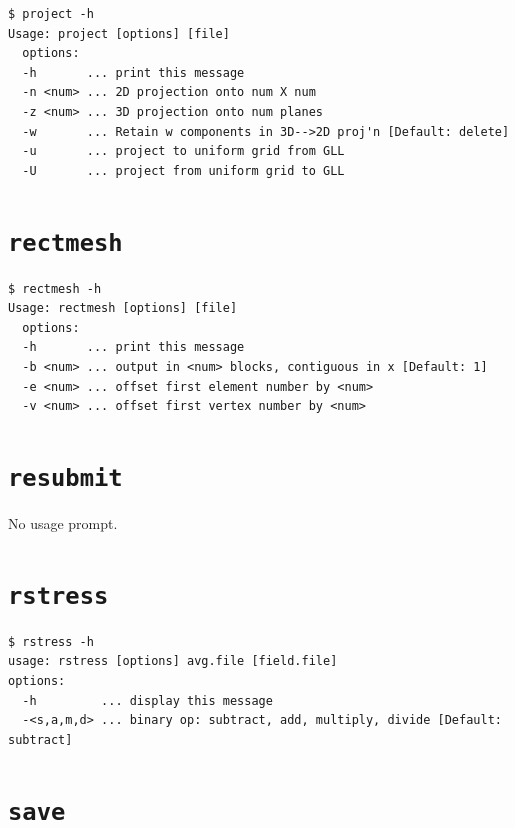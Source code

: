 \documentclass[11pt]{report}
\begin{document}
{\small
\begin{verbatim}
$ project -h
Usage: project [options] [file]
  options:
  -h       ... print this message
  -n <num> ... 2D projection onto num X num
  -z <num> ... 3D projection onto num planes
  -w       ... Retain w components in 3D-->2D proj'n [Default: delete]
  -u       ... project to uniform grid from GLL
  -U       ... project from uniform grid to GLL
\end{verbatim}
}
%

\section{\texttt{rectmesh}}
\label{sec.rectmesh}

{\small
\begin{verbatim}
$ rectmesh -h
Usage: rectmesh [options] [file]
  options:
  -h       ... print this message
  -b <num> ... output in <num> blocks, contiguous in x [Default: 1]
  -e <num> ... offset first element number by <num>
  -v <num> ... offset first vertex number by <num>
\end{verbatim}
}
%

\section{\texttt{resubmit}}
\label{sec.resubmit}

No usage prompt.
%

\section{\texttt{rstress}}
\label{sec.rstress}

{\small
\begin{verbatim}
$ rstress -h
usage: rstress [options] avg.file [field.file]
options:
  -h         ... display this message
  -<s,a,m,d> ... binary op: subtract, add, multiply, divide [Default: subtract]
\end{verbatim}
}
%

\section{\texttt{save}}
\label{sec.save}
\end{document}
